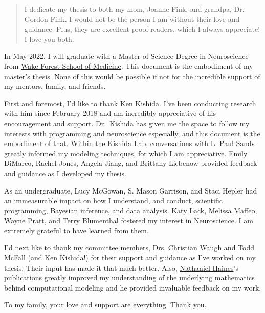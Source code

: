 
\begin{acknowledgements}

\begin{quote}
I dedicate my thesis to both my mom, Joanne Fink, and grandpa, Dr. Gordon Fink. I would not be the person I am without their love and guidance. Plus, they are excellent proof-readers, which I always appreciate! I love you both.
\end{quote}

In May 2022, I will graduate with a Master of Science Degree in Neuroscience from \href{https://wakehealth.edu}{Wake Forest School of Medicine}. This document is the embodiment of my master's thesis. None of this would be possible if not for the incredible support of my mentors, family, and friends.

First and foremost, I'd like to thank Ken Kishida. I've been conducting research with him since February 2018 and am incredibly appreciative of his encouragement and support. Dr.~Kishida has given me the space to follow my interests with programming and neuroscience especially, and this document is the embodiment of that. Within the Kishida Lab, conversations with L. Paul Sands greatly informed my modeling techniques, for which I am appreciative. Emily DiMarco, Rachel Jones, Angela Jiang, and Brittany Liebenow provided feedback and guidance as I developed my thesis.

As an undergraduate, Lucy McGowan, S. Mason Garrison, and Staci Hepler had an immeasurable impact on how I understand, and conduct, scientific programming, Bayesian inference, and data analysis. Katy Lack, Melissa Maffeo, Wayne Pratt, and Terry Blumenthal fostered my interest in Neuroscience. I am extremely grateful to have learned from them.

I'd next like to thank my committee members, Drs. Christian Waugh and Todd McFall (and Ken Kishida!) for their support and guidance as I've worked on my thesis. Their input has made it that much better. Also, \href{http://haines-lab.com}{Nathaniel Haines}'s publications greatly improved my understanding of the underlying mathematics behind computational modeling and he provided invaluable feedback on my work.

To my family, your love and support are everything. Thank you.

\end{acknowledgements}

\tableofcontents

\newpage

\listoffigures

